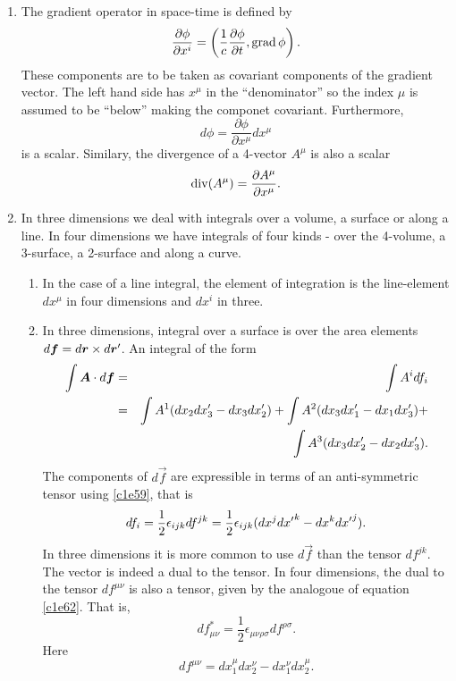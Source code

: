 \begin{enumerate}
\item The gradient operator in space-time is defined by
\begin{equation}\label{c1e65}
\frac{\partial\phi}{\partial x^i} = 
\left(\frac{1}{c}\frac{\partial\phi}{\partial t}, \operatorname{grad}\phi\right).
\end{equation}
These components are to be taken as covariant components of the gradient vector.
The left hand side has $x^\mu$ in the ``denominator'' so the index $\mu$ is assumed
to be ``below'' making the componet covariant. Furthermore,
\begin{equation}\label{c1e66}
d\phi = \frac{\partial\phi}{\partial x^\mu}dx^\mu
\end{equation}
is a scalar. Similary, the divergence of a 4-vector $A^\mu$ is also a scalar
\begin{equation}\label{c1e67}
\operatorname{div}(A^\mu) = \frac{\partial A^\mu}{\partial x^\mu}.
\end{equation}

\item In three dimensions we deal with integrals over a volume, a surface or
along a line. In four dimensions we have integrals of four kinds - over the
4-volume, a 3-surface, a 2-surface and along a curve.
\begin{enumerate}
\item In the case of a line integral, the element of integration is the line-element
$dx^\mu$ in four dimensions and $dx^i$ in three.

\item In three dimensions, integral over a surface is over the area elements 
$d\boldsymbol{f} = d\boldsymbol{r} \times d\boldsymbol{r}^\prime$. An integral of the form
\begin{eqnarray*}
\int \boldsymbol{A}\cdot d\boldsymbol{f} &=& \int A^i df_i \\
 &=& \int A^1(dx_2dx_3^\prime - dx_3dx_2^\prime) + \int A^2(dx_3dx_1^\prime - dx_1dx_3^\prime) + \\
 & & \int A^3(dx_3dx_2^\prime - dx_2dx_3^\prime).
\end{eqnarray*}
The components of $d\vec{f}$ are expressible in terms of an anti-symmetric tensor 
using \eqref{c1e59}, that is
\begin{equation}\label{c1e68}
df_i = \frac{1}{2}\epsilon_{ijk}df^{jk} = \frac{1}{2}\epsilon_{ijk}(dx^jd{x^\prime}^k - 
dx^kd{x^\prime}^j).
\end{equation}
In three dimensions it is more common to use $d\vec{f}$ than the tensor $df^{jk}$.
The vector is indeed a dual to the tensor. In four dimensions, the dual to the
tensor $df^{\mu\nu}$ is also a tensor, given by the analogoue of equation \eqref{c1e62}. 
That is,
\begin{equation}\label{c1e69}
df^\ast_{\mu\nu} = \frac{1}{2}\epsilon_{\mu\nu\rho\sigma}df^{\rho\sigma}.
\end{equation}
Here
\begin{equation}\label{c1e70}
df^{\mu\nu} = dx_1^\mu dx_2^\nu - dx_1^\nu dx_2^\mu.
\end{equation}


\end{enumerate}
\end{enumerate}
